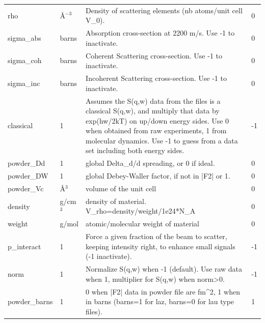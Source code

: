 \begin{longtable}{p{}p{}p{}p{}}
rho & \AA{}$^{-3}$ & Density of scattering elements (nb atoms/unit cell V\_0). & 0 \\
sigma\_abs & barns & Absorption cross-section at 2200 m/s. Use -1 to inactivate. & 0 \\
sigma\_coh & barns & Coherent Scattering cross-section. Use -1 to inactivate. & 0 \\
sigma\_inc & barns & Incoherent Scattering cross-section. Use -1 to inactivate. & 0 \\
classical & 1 & Assumes the S(q,w) data from the files is a classical S(q,w), and multiply that data by exp(hw/2kT) on up/down energy sides. Use 0 when obtained from raw experiments, 1 from molecular dynamics. Use -1 to guess from a data set including both energy sides. & -1 \\
powder\_Dd & 1 & global Delta\_d/d spreading, or 0 if ideal. & 0 \\
powder\_DW & 1 & global Debey-Waller factor, if not in |F2| or 1. & 0 \\
powder\_Vc & \AA{}$^{3}$ & volume of the unit cell & 0 \\
density & g/cm$^{3}$ & density of material. V\_rho=density/weight/1e24*N\_A & 0 \\
weight & g/mol & atomic/molecular weight of material & 0 \\
p\_interact & 1 & Force a given fraction of the beam to scatter, keeping intensity right, to enhance small signals (-1 inactivate). & -1 \\
norm & 1 & Normalize S(q,w) when -1 (default). Use raw data when 1, multiplier for S(q,w) when norm\textgreater{}0. & -1 \\
powder\_barns & 1 & 0 when |F2| data in powder file are fm\textasciicircum{}2, 1 when in barns (barns=1 for laz, barns=0 for lau type files). & 1 \\
\bottomrule
\end{longtable}

